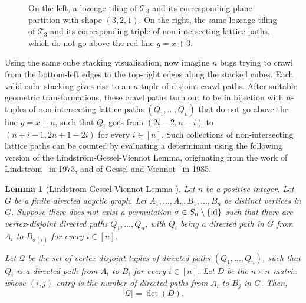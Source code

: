 \documentclass{article}
\newtheorem{lemma}[theorem]{Lemma}
\begin{document}
\begin{figure}[h]
\begin{minipage}{0.24\textwidth}
\begin{center}
\end{center}
\end{minipage}



\newcommand\sqr{}
\def\sqr(#1:#2){
\draw[color=gray, very thin] ($(#1,#2)$) -- ($({(#1+0.4)},{(#2)})$) -- ($({(#1+0.4)},{(#2+0.4)})$) -- ($({#1},{(#2+0.4)})$) -- ($(#1,#2)$);
}
    \caption{On the left, a lozenge tiling of $\mathcal{T}_3$ and its corresponding plane partition with shape $(3,2,1)$. On the right, the same lozenge tiling of $\mathcal{T}_3$ and its corresponding triple of non-intersecting lattice paths, which do not go above the red line $y=x+3$.}\label{fig:parLGV}
\end{figure}

Using the same cube stacking visualisation, now imagine $n$ bugs trying to crawl from the bottom-left edges to the top-right edges along the stacked cubes. Each valid cube stacking gives rise to an $n$-tuple of disjoint crawl paths. After suitable geometric transformations, these crawl paths turn out to be in bijection with $n$-tuples of non-intersecting lattice paths $(Q_1,\ldots,Q_n)$ that do not go above the line $y=x+n$, such that $Q_i$ goes from $(2i-2,n-i)$ to $(n+i-1,2n+1-2i)$ for every $i\in[n]$. Such collections of non-intersecting lattice paths can be counted by evaluating a determinant using the following version of the Lindstr\"om-Gessel-Viennot Lemma, originating from the work of Lindstr\"om~\cite{Lind} in 1973, and of Gessel and Viennot~\cite{GV} in 1985.
\begin{lemma}[Lindstr\"om-Gessel-Viennot Lemma {\cite[Corollary 10.13.2]{Kra}}]\label{lemma:LGV}
Let $n$ be a positive integer. Let $G$ be a finite directed acyclic graph. Let $A_1,\ldots,A_n,B_1,\ldots,B_n$ be distinct vertices in $G$. Suppose there does not exist a permutation $\sigma\in S_n\setminus\{\textup{id}\}$ such that there are vertex-disjoint directed paths $Q_1,\ldots,Q_n$, with $Q_i$ being a directed path in $G$ from $A_i$ to $B_{\sigma(i)}$ for every $i\in[n]$.

Let $\mathcal{Q}$ be the set of vertex-disjoint tuples of directed paths $(Q_1,\ldots,Q_n)$, such that $Q_i$ is a directed path from $A_i$ to $B_i$ for every $i\in[n]$. Let $D$ be the $n\times n$ matrix whose $(i,j)$-entry is the number of directed paths from $A_i$ to $B_j$ in $G$. Then,
\[|\mathcal{Q}|=\det(D).\]
\end{lemma}
\end{document}
